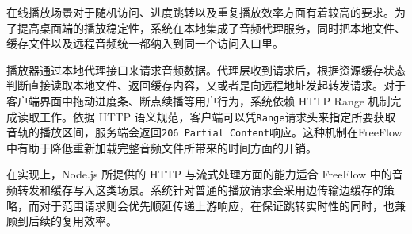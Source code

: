 在线播放场景对于随机访问、进度跳转以及重复播放效率方面有着较高的要求。为了提高桌面端的播放稳定性，系统在本地集成了音频代理服务，同时把本地文件、缓存文件以及远程音频统一都纳入到同一个访问入口里。

播放器通过本地代理接口来请求音频数据。代理层收到请求后，根据资源缓存状态判断直接读取本地文件、返回缓存内容，又或者是向远程地址发起转发请求。对于客户端界面中拖动进度条、断点续播等用户行为，系统依赖 HTTP Range 机制完成读取工作。依据 HTTP 语义规范，客户端可以凭\texttt{Range}请求头来指定所要获取音轨的播放区间，服务端会返回\texttt{206 Partial Content}响应\cite{rfc9110}。这种机制在FreeFlow中有助于降低重新加载完整音频文件所带来的时间方面的开销。

在实现上，Node.js 所提供的 HTTP 与流式处理方面的能力适合 FreeFlow 中的音频转发和缓存写入这类场景\cite{nodeHttp,nodeStream}。系统针对普通的播放请求会采用边传输边缓存的策略，而对于范围请求则会优先顺延传递上游响应，在保证跳转实时性的同时，也兼顾到后续的复用效率。